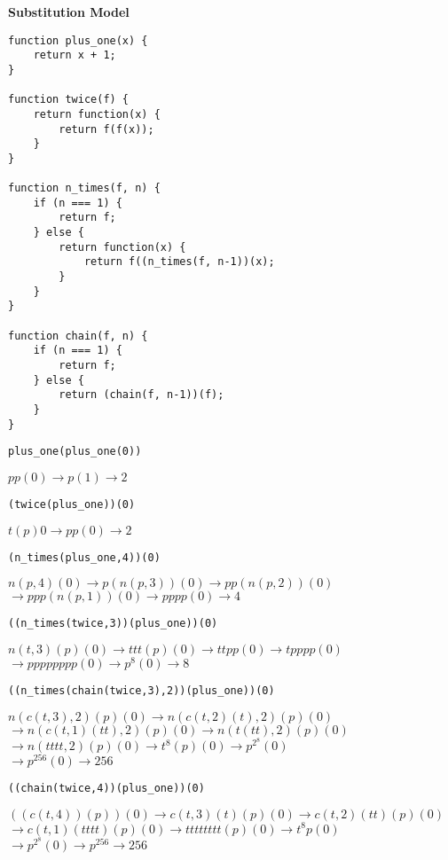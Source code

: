 \documentclass[a4paper]{article} \usepackage[backend=biber, style=numeric, sorting=none]{biblatex}
\begin{document}
\begin{multicols*}{4}
{\small\textbf{Substitution Model}}
\begin{verbatim}
function plus_one(x) {
    return x + 1;
}

function twice(f) {
    return function(x) {
        return f(f(x));
    }
}

function n_times(f, n) {
    if (n === 1) {
        return f;
    } else {
        return function(x) {
            return f((n_times(f, n-1))(x);
        }
    }
}

function chain(f, n) {
    if (n === 1) {
        return f;
    } else {
        return (chain(f, n-1))(f);
    }
}
\end{verbatim}
\par \texttt{plus\_one(plus\_one(0))}
\par $pp(0) \rightarrow p(1) \rightarrow 2$
\\
\par \texttt{(twice(plus\_one))(0)}
\par $t(p)0 \rightarrow pp(0) \rightarrow 2$
\\
\par \texttt{(n\_times(plus\_one,4))(0)}
\par $n(p,4)(0) \rightarrow p(n(p,3))(0) \rightarrow pp(n(p,2))(0)$\\
     $\rightarrow ppp(n(p,1))(0) \rightarrow pppp(0) \rightarrow 4$
\\
\par \texttt{((n\_times(twice,3))(plus\_one))(0)}
\par $n(t,3)(p)(0) \rightarrow ttt(p)(0) \rightarrow ttpp(0) \rightarrow tpppp(0)$\\
     $\rightarrow pppppppp(0) \rightarrow p^8(0) \rightarrow 8$
\\
\par \texttt{((n\_times(chain(twice,3),2))(plus\_one))(0)}
\par $n(c(t,3),2)(p)(0) \rightarrow n(c(t,2)(t),2)(p)(0)$\\
     $\rightarrow n(c(t,1)(tt), 2)(p)(0) \rightarrow n(t(tt), 2)(p)(0)$\\
     $\rightarrow n(tttt, 2)(p)(0) \rightarrow t^8(p)(0) \rightarrow p^{2^8}(0)$\\
     $\rightarrow p^{256}(0) \rightarrow 256$
\\
\par \texttt{((chain(twice,4))(plus\_one))(0)}
\par $((c(t,4))(p))(0) \rightarrow c(t,3)(t)(p)(0) \rightarrow c(t,2)(tt)(p)(0)$\\
     $\rightarrow c(t,1)(tttt)(p)(0) \rightarrow tttttttt(p)(0) \rightarrow t^8p(0)$\\
     $\rightarrow p^{2^8}(0) \rightarrow p^{256} \rightarrow 256$
\\


\end{multicols*}
\end{document}
